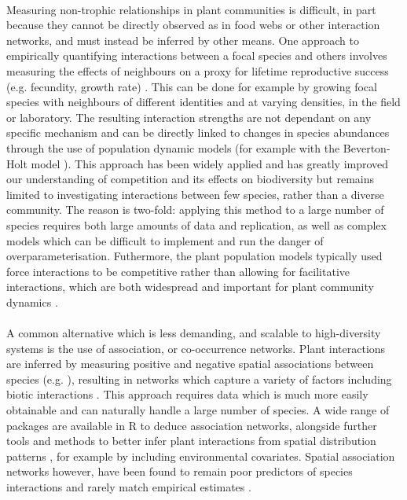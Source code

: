 \documentclass[a4,12pt]{article}
\begin{document}
    \paragraph{}
    Measuring non-trophic relationships in plant communities is difficult, in part because they cannot be directly observed as in food webs or other interaction networks, and must instead be inferred by other means. One approach to empirically quantifying interactions between a focal species and others involves measuring the effects of neighbours on a proxy for lifetime reproductive success (e.g. fecundity, growth rate) \citep{Connell1961, Grace1990}. This can be done for example by growing focal species with neighbours of different identities and at varying densities, in the field or laboratory. The resulting interaction strengths are not dependant on any specific mechanism and can be directly linked to changes in species abundances through the use of population dynamic models (for example with the Beverton-Holt model \citet{Beverton1957, Levine2009}). This approach has been widely applied and has greatly improved our understanding of competition and its effects on biodiversity \citep{Tilman1982, Chesson2000b, Levine2008, Adler2010, Mayfield2010a, Kraft2015} but remains limited to investigating interactions between few species, rather than a diverse community. The reason is two-fold: applying this method to a large number of species requires both large amounts of data and replication, as well as complex models which can be difficult to implement and run the danger of overparameterisation. Futhermore, the plant population models typically used force interactions to be competitive rather than allowing for facilitative interactions, which are both widespread and important for plant community dynamics \citep{}.

    \paragraph{} 
    A common alternative which is less demanding, and scalable to high-diversity systems is the use of association, or co-occurrence networks. Plant interactions are inferred by measuring positive and negative spatial associations between species (e.g. \citet{Saiz2011}), resulting in networks which capture a variety of factors including biotic interactions \citep{Losapio2019}. This approach requires data which is much more easily obtainable and can naturally handle a large number of species. A wide range of packages are available in R to deduce association networks, alongside further tools and methods to better infer plant interactions from spatial distribution patterns \citep{Keil2019}, for example by including environmental covariates. Spatial association networks however, have been found to remain poor predictors of species interactions and rarely match empirical estimates \citep{Sander2017,Barner2018, Thurman2019, Blanchet2020}.
\end{document}
